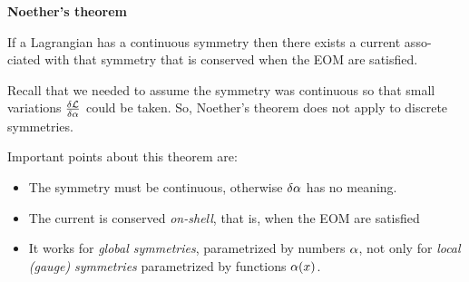 \begin{teo}{\textbf{Noether's theorem}}

	If a Lagrangian has a continuous symmetry then there exists a current asso- ciated with that symmetry that is conserved when the EOM are satisfied.
\end{teo}

Recall that we needed to assume the symmetry was continuous so that small variations $\frac{\delta\mathcal{L} }{\delta\alpha }$ could be taken. So, Noether's theorem does not apply to discrete symmetries.

Important points about this theorem are:
\begin{itemize}
	\item The symmetry must be continuous, otherwise $\delta \alpha $ has no meaning.
	\item The current is conserved \textit{on-shell}, that is, when the EOM are satisfied
	\item It works for \textit{global symmetries}, parametrized by numbers $\alpha $, not only for \textit{local (gauge)} \textit{symmetries} parametrized by functions $\alpha(x)$.
\end{itemize}














































